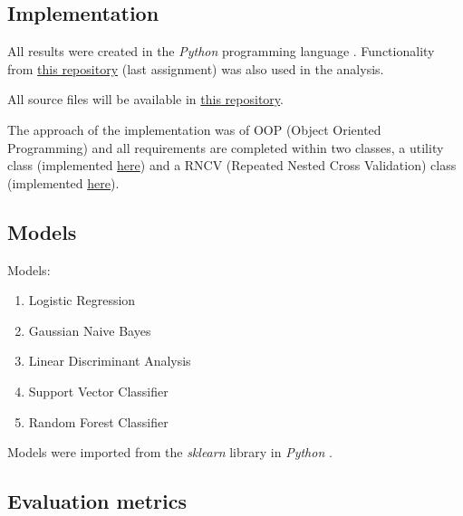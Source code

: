 \documentclass[12pt, a4paper]{article}
\begin{document}
\begin{multicols}{2}
    \subsection{Implementation} \label{subsec:impl}

    All results were created in the \textit{Python} programming language \cite{noauthor_3132_nodate}. Functionality from \href{https://github.com/ArisPodotas/Assignment-1-MLICB}{this repository} (last assignment) was also used in the analysis.
    \newline

    All source files will be available in \href{https://github.com/ArisPodotas/Assignment-2-MLICB/tree/master}{this repository}.
    \newline

    The approach of the implementation was of OOP (Object Oriented Programming) and all requirements are completed within two classes, a utility class (implemented \href{https://github.com/ArisPodotas/Assignment-2-MLICB/blob/master/src/utils.py}{here}) and a RNCV (Repeated Nested Cross Validation) class (implemented \href{https://github.com/ArisPodotas/Assignment-2-MLICB/blob/master/src/classes.py}{here}).
    \newline

    \subsection{Models} \label{subsec:models}

    Models:
    \newline

    \begin{enumerate} \label{enm:models}
        \item Logistic Regression
        \item Gaussian Naive Bayes
        \item Linear Discriminant Analysis
        \item Support Vector Classifier
        \item Random Forest Classifier
    \end{enumerate}

    Models were imported from the \textit{sklearn} \cite{noauthor_scikit-learn_nodate} library in \textit{Python} \cite{noauthor_3132_nodate}.
    \newline

    \subsection{Evaluation metrics} \label{subsec:metrics}


\end{multicols}
\end{document}
